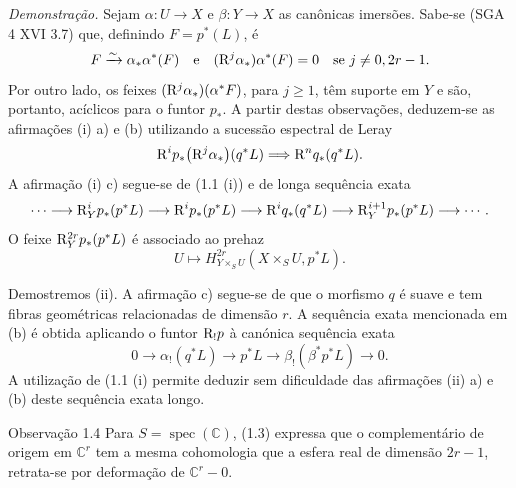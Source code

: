 \emph{Demonstração.} Sejam $\alpha:U\to X$ e $\beta:Y\to X$ as canônicas imersões. Sabe-se (SGA 4 XVI 3.7) que, definindo $F=p^*(L)$, é
\[
F\xrightarrow{\sim}\alpha_*\alpha^*(F)
\quad\text{e}\quad
(\mathrm{R}^j\alpha_*)\alpha^*(F)=0\quad\text{se }j\ne0,2r-1.
\]
Por outro lado, os feixes $(\mathrm{R}^j\alpha_*)(\alpha^*F)$, para $j\ge1$, têm suporte em $Y$ e são, portanto, acíclicos para o funtor $p_*$. A partir destas observações, deduzem-se as afirmações (i) a) e (b) utilizando a sucessão espectral de Leray
\[
\mathrm{R}^i p_*\bigl(\mathrm{R}^j\alpha_*\bigr)(q^*L)\Longrightarrow \mathrm{R}^n q_*(q^*L).
\]
A afirmação (i) c) segue-se de (1.1 (i)) e de longa sequência exata
\[
\cdots\longrightarrow \mathrm{R}_Y^i p_*(p^*L)\longrightarrow \mathrm{R}^i p_*(p^*L)\longrightarrow \mathrm{R}^i q_*(q^*L)
\longrightarrow \mathrm{R}_Y^{i+1}p_*(p^*L)\longrightarrow\cdots.
\]
O feixe $\mathrm{R}_Y^{2r}p_*(p^*L)$ é associado ao prehaz
\[
U\longmapsto H^{2r}_{Y\times_S U}(X\times_S U,p^*L).
\]

Demostremos (ii). A afirmação c) segue-se de que o morfismo $q$ é suave e tem fibras geométricas relacionadas de dimensão $r$. A sequência exata mencionada em (b) é obtida aplicando o funtor $\mathrm{R}_!p$ à canónica sequência exata
\[
0\longrightarrow \alpha_!(q^*L)\longrightarrow p^*L\longrightarrow \beta_!(\beta^*p^*L)\longrightarrow 0.
\]
A utilização de (1.1 (i) permite deduzir sem dificuldade das afirmações (ii) a) e (b) deste sequência exata longo.

\begin{statement}{Observação 1.4}
Para $S=\operatorname{spec}(\mathbb C)$, (1.3) expressa que o complementário de origem em $\mathbb C^r$ tem a mesma cohomologia que a esfera real de dimensão $2r-1$, retrata-se por deformação de $\mathbb C^r-0$.
\end{statement}
